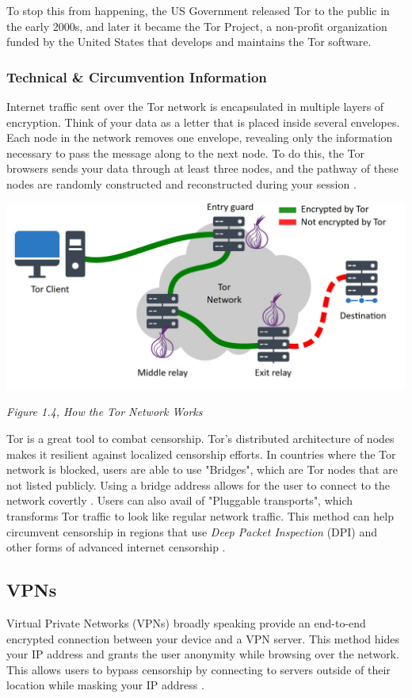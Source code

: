 To stop this from happening, the US Government released Tor to the public in the early 2000s, and later it became the Tor Project, a non-profit organization funded by the United States that develops and maintains the Tor software. 

\subsubsection{Technical \& Circumvention Information}

Internet traffic sent over the Tor network is encapsulated in multiple layers of encryption. Think of your data as a letter that is placed inside several envelopes. Each node in the network removes one envelope, revealing only the information necessary to pass the message along to the next node. To do this, the Tor browsers sends your data through at least three nodes, and the pathway of these nodes are randomly constructed and reconstructed during your session \cite{dingledine2004tor}.

\centerline{\includegraphics[width=480pt]{Griff/TCD SCSS CAPSTONE/Literature Review/How tor works.jpg}}

\centerline{\textit{Figure 1.4, How the Tor Network Works}}

Tor is a great tool to combat censorship. Tor's distributed architecture of nodes makes it resilient against localized censorship efforts. In countries where the Tor network is blocked, users are able to use "Bridges", which are Tor nodes that are not listed publicly. Using a bridge address allows for the user to connect to the network covertly \cite{torprojectBRIDGESProject}. Users can also avail of "Pluggable transports", which transforms Tor traffic to look like regular network traffic. This method can help circumvent censorship in regions that use \textit{Deep Packet Inspection} (DPI) and other forms of advanced internet censorship \cite{torprojectCIRCUMVENTIONProject}.

\subsection{VPNs}

Virtual Private Networks (VPNs) broadly speaking provide an end-to-end encrypted connection between your device and a VPN server. This method hides your IP address and grants the user anonymity while browsing over the network. This allows users to bypass censorship by connecting to servers outside of their location while masking your IP address \cite{TomsGuideVPN}. 